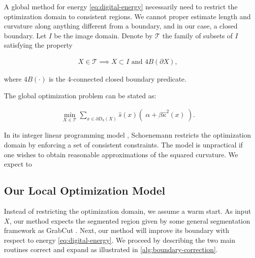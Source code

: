 \documentclass[runningheads]{llncs}
\begin{document}
A global method for energy \eqref{eq:digital-energy} necessarily need to restrict the optimization domain to consistent regions. We cannot proper estimate length and curvature along anything different from a boundary, and in our case, a closed boundary. Let $I$ be the image domain. Denote by $\mathcal{T}$ the family of subsets of $I$ satisfying the property

\begin{align*}
	X \in \mathcal{T} \implies X \subset I \text{ and } 4B(\partial X),
\end{align*} 

where $4B(\cdot)$ is the $4$-connected closed boundary predicate. 


The global optimization problem can be stated as:

\begin{align*}
	\min_{X \in \mathcal{T}}{\sum_{x \in \partial D_h(X)}{ \hat{s}(x)\left(\; \alpha + \beta \hat{\kappa}^2(x) \; \right)}.}
\end{align*}

In its integer linear programming model \cite{schoenemann09}, Schoenemann restricts the optimization domain by enforcing a set of consistent constraints. The model is unpractical if one wishes to obtain reasonable approximations of the squared curvature. We expect to 

\subsection{Our Local Optimization Model}


Instead of restricting the optimization domain, we assume a warm start. As input $X$, our method expects the segmented region given by some general segmentation framework as GrabCut \cite{rother04}. Next, our method will improve its boundary with respect to energy \eqref{eq:digital-energy}. We proceed by describing the two main routines correct and expand as illustrated in \ref{alg:boundary-correction}.
\end{document}
